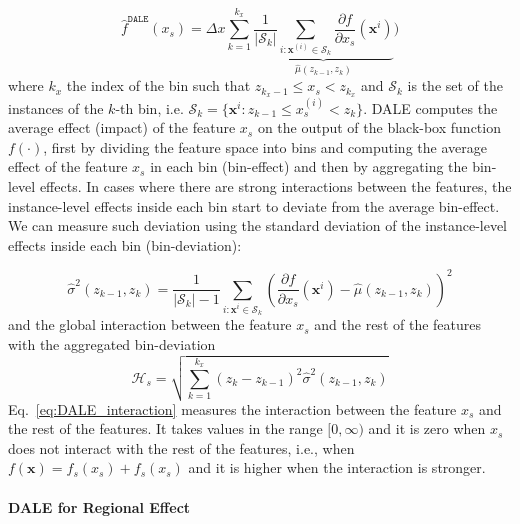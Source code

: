 \documentclass[12pt]{article}
\newcommand{\dfdx}{\frac{\partial f}{\partial x_s}}
\newcommand{\xb}{\mathbf{x}}
\begin{document}
\begin{equation}  \label{eq:DALE_accumulated_mean_est}
  \hat{f}^{\mathtt{DALE}}(x_s) = \Delta x \sum_{k=1}^{k_x} \underbrace{\frac{1}{|\mathcal{S}_k|} \sum_{i:\mathbf{x}^{(i)} \in
    \mathcal{S}_k} \dfdx(\mathbf{x}^i)}_{\hat{\mu}(z_{k-1}, z_k)})
\end{equation}
%
where \(k_x\) the index of the bin such that
\(z_{k_x-1} \leq x_s < z_{k_x} \) and \(\mathcal{S}_k\)
is the set of the instances of the \(k\)-th bin, i.e.
\( \mathcal{S}_k = \{ \xb^i : z_{k-1} \leq x^{(i)}_s < z_{k} \} \).
DALE computes the average effect (impact) of the feature \(x_s\) on the output of the black-box function \(f(\cdot)\),
first by dividing the feature space into bins and computing the average effect of the feature \(x_s\) in each bin
(bin-effect) and then by aggregating the bin-level effects.
In cases where there are strong interactions between the features, the instance-level effects inside each bin
start to deviate from the average bin-effect.
We can measure such deviation using the standard deviation of the instance-level effects inside each bin (bin-deviation):

\begin{equation}
  \label{eq:var_bin_approx}
  \hat{\sigma}^2(z_{k-1}, z_k) = \frac{1}{|\mathcal{S}_k| - 1}
\sum_{i:\mathbf{x}^i \in \mathcal{S}_k} \left ( \dfdx(\mathbf{x}^i) -
  \hat{\mu}(z_{k-1}, z_k) \right )^2
\end{equation}
%
and the global interaction between the feature \(x_s\) and the rest of the features with the
aggregated bin-deviation
\begin{equation}
  \label{eq:DALE_interaction}
  \mathcal{H}_s = \sqrt{ \sum_{k=1}^{k_x} (z_k - z_{k-1})^2 \hat{\sigma}^2(z_{k-1}, z_k) }
\end{equation}
%
Eq.~\eqref{eq:DALE_interaction} measures the interaction between the feature \(x_s\) and the rest of the features.
It takes values in the range \([0, \infty)\) and it is zero when \(x_s\) does not interact with the rest of the features,
i.e., when $f(\xb) = f_s(x_s) + f_{s}(x_s)$ and it is higher when the interaction is stronger.

\paragraph{DALE for Regional Effect}
\end{document}
